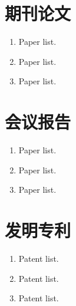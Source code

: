 {%
    \section*{期刊论文}
    \begin{enumerate}
        \item Paper list.
        \item Paper list.
        \item Paper list.
    \end{enumerate}

    \section*{会议报告}
    \begin{enumerate}
        \item Paper list.
        \item Paper list.
        \item Paper list.
    \end{enumerate}

    \section*{发明专利}
    \begin{enumerate}
        \item Patent list.
        \item Patent list.
        \item Patent list.
    \end{enumerate}
}